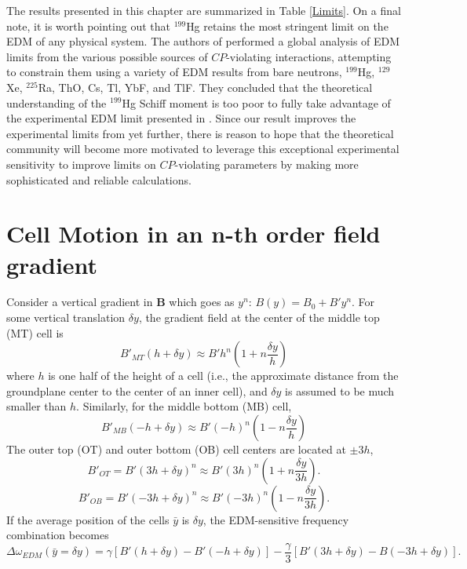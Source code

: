 \documentclass [10pt, twoside] {uwthesis}[2012/04/02]
\begin{document}
The results presented in this chapter are summarized in Table \ref{Limits}. On a final note, it is worth pointing out that $^{199}$Hg retains the most stringent limit on the EDM of any physical system. The authors of \cite{2015_Chupp_Xe_EDM_Motivation} performed a global analysis of EDM limits from the various possible sources of $CP$-violating interactions, attempting to constrain them using a variety of EDM results from bare neutrons, $^{199}$Hg, $^{129}$Xe, $^{225}$Ra, ThO, Cs, Tl, YbF, and TlF. They concluded that the theoretical understanding of the $^{199}$Hg Schiff moment is too poor to fully take advantage of the experimental EDM limit presented in \cite{2009_Hg_EDM}. Since our result improves the experimental limits from \cite{2009_Hg_EDM} yet further, there is reason to hope that the theoretical community will become more motivated to leverage this exceptional experimental sensitivity to improve limits on $CP$-violating parameters by making more sophisticated and reliable calculations.


	

\appendix

\chapter{Cell Motion in an n-th order field gradient} \label{nth_gradient}
Consider a vertical gradient in $\mathbf{B}$ which goes as $y^n$: $B(y) = B_0 + B'y^n$. For some vertical translation $\delta y$, the gradient field at the center of the middle top (MT) cell is
\begin{equation}
B'_{MT}(h+\delta y) \approx B' h^n(1+n\frac{\delta y}{h})
\end{equation}
where $h$ is one half of the height of a cell (i.e., the approximate distance from the groundplane center to the center of an inner cell), and $\delta y$ is assumed to be much smaller than $h$. Similarly, for the middle bottom (MB) cell,
\begin{equation}
B'_{MB}(-h+\delta y) \approx B'(-h)^n(1-n\frac{\delta y}{h})
\end{equation}
The outer top (OT) and outer bottom (OB) cell centers are located at $\pm 3h$,
\begin{equation}
B'_{OT} = B'(3h+\delta y)^n \approx B'(3h)^n(1+n\frac{\delta y}{3h}).
\end{equation}
\begin{equation}
B'_{OB} = B'(-3h+\delta y)^n \approx B'(-3h)^n(1-n\frac{\delta y}{3h}).
\end{equation}
If the average position of the cells $\bar{y}$ is $\delta y$, the EDM-sensitive frequency combination becomes
\begin{equation}
\Delta\omega_{EDM}(\bar{y}=\delta y) = \gamma[B'(h+\delta y) - B'(-h + \delta y)] -  \frac{\gamma}{3}[B'(3h+\delta y) - B(-3h+\delta y)].
\end{equation}
\end{document}
